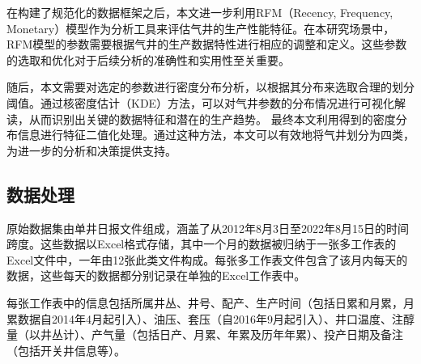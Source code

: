 在构建了规范化的数据框架之后，本文进一步利用RFM（Recency, Frequency, Monetary）模型作为分析工具来评估气井的生产性能特征。在本研究场景中，RFM模型的参数需要根据气井的生产数据特性进行相应的调整和定义。这些参数的选取和优化对于后续分析的准确性和实用性至关重要。

随后，本文需要对选定的参数进行密度分布分析，以根据其分布来选取合理的划分阈值。通过核密度估计（KDE）方法，可以对气井参数的分布情况进行可视化解读，从而识别出关键的数据特征和潜在的生产趋势。
最终本文利用得到的密度分布信息进行特征二值化处理。通过这种方法，本文可以有效地将气井划分为四类，为进一步的分析和决策提供支持。
\subsection{数据处理}
\label{cha:data}
原始数据集由单井日报文件组成，涵盖了从2012年8月3日至2022年8月15日的时间跨度。这些数据以Excel格式存储，其中一个月的数据被归纳于一张多工作表的Excel文件中，一年由12张此类文件构成。每张多工作表文件包含了该月内每天的数据，这些每天的数据都分别记录在单独的Excel工作表中。

每张工作表中的信息包括所属井丛、井号、配产、生产时间（包括日累和月累，月累数据自2014年4月起引入）、油压、套压（自2016年9月起引入）、井口温度、注醇量（以井丛计）、产气量（包括日产、月累、年累及历年年累）、投产日期及备注（包括开关井信息等）。

